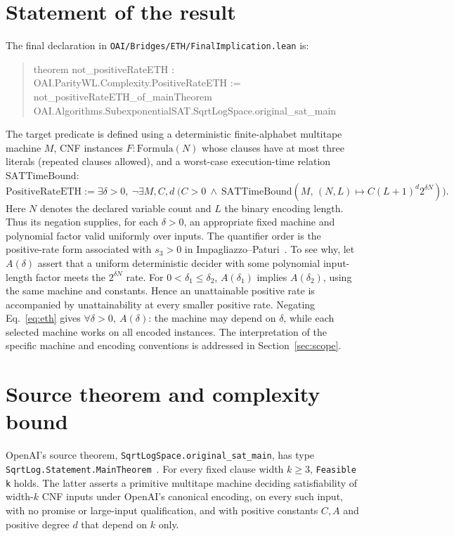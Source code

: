 \documentclass[11pt,letterpaper]{article}
\newcommand{\lean}[1]{\texttt{#1}}
\begin{document}
\section{Statement of the result}
The final declaration in \lean{OAI/Bridges/ETH/FinalImplication.\allowbreak{}lean} is:
\begin{quote}\small\ttfamily
 theorem not\_positiveRateETH :\\
 \quad\textlnot{} OAI.ParityWL.Complexity.PositiveRateETH :=\\
 \quad not\_positiveRateETH\_of\_mainTheorem\\
 \qquad OAI.Algorithms.SubexponentialSAT.SqrtLogSpace.original\_sat\_main
\end{quote}
The target predicate is defined using a deterministic finite-alphabet multitape machine $M$, CNF instances $F:\mathrm{Formula}(N)$ whose clauses have at most three literals (repeated clauses allowed), and a worst-case execution-time relation $\mathrm{SATTimeBound}$:
\begin{equation}
\mathrm{PositiveRateETH}:=\exists\delta>0,\ \neg\exists M,C,d\;\bigl(C>0\ \wedge\ \mathrm{SATTimeBound}(M,\, (N,L)\mapsto C(L+1)^d 2^{\delta N})\bigr).
\label{eq:eth}
\end{equation}
Here $N$ denotes the declared variable count and $L$ the binary encoding length. Thus its negation supplies, for each $\delta>0$, an appropriate fixed machine and polynomial factor valid uniformly over inputs. The quantifier order is the positive-rate form associated with $s_3>0$ in Impagliazzo--Paturi~\cite{ip}. To see why, let $A(\delta)$ assert that a uniform deterministic decider with some polynomial input-length factor meets the $2^{\delta N}$ rate. For $0<\delta_1\le\delta_2$, $A(\delta_1)$ implies $A(\delta_2)$, using the same machine and constants. Hence an unattainable positive rate is accompanied by unattainability at every smaller positive rate. Negating Eq.~\eqref{eq:eth} gives $\forall\delta>0,\ A(\delta)$: the machine may depend on $\delta$, while each selected machine works on all encoded instances. The interpretation of the specific machine and encoding conventions is addressed in Section~\ref{sec:scope}.

\section{Source theorem and complexity bound}
OpenAI's source theorem, \lean{SqrtLogSpace.\allowbreak{}original\_sat\_main}, has type \lean{SqrtLog.\allowbreak{}Statement.\allowbreak{}MainTheorem}~\cite{openai}. For every fixed clause width $k\geq3$, \lean{Feasible k} holds. The latter asserts a primitive multitape machine deciding satisfiability of width-$k$ CNF inputs under OpenAI's canonical encoding, on every such input, with no promise or large-input qualification, and with positive constants $C,A$ and positive degree $d$ that depend on $k$ only.
\end{document}
